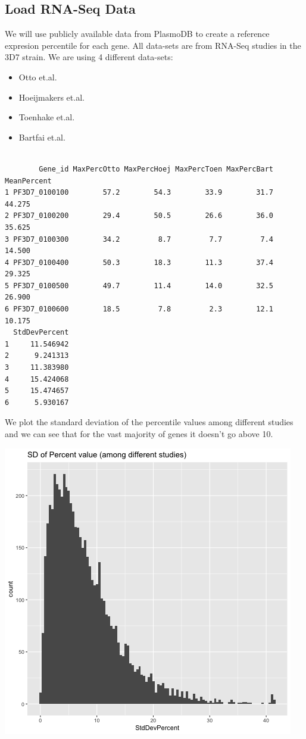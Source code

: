 \documentclass[11pt]{article}
\begin{document}
\subsection{Load RNA-Seq Data}
\label{sec:orga3ddbf5}
We will use publicly available data from PlasmoDB to create a reference expresion percentile for each gene.
All data-sets are from RNA-Seq studies in the 3D7 strain.
We are using 4 different data-sets:
\begin{itemize}
\item Otto et.al.
\item Hoeijmakers et.al.
\item Toenhake et.al.
\item Bartfai et.al.
\end{itemize}

\begin{verbatim}

        Gene_id MaxPercOtto MaxPercHoej MaxPercToen MaxPercBart MeanPercent
1 PF3D7_0100100        57.2        54.3        33.9        31.7      44.275
2 PF3D7_0100200        29.4        50.5        26.6        36.0      35.625
3 PF3D7_0100300        34.2         8.7         7.7         7.4      14.500
4 PF3D7_0100400        50.3        18.3        11.3        37.4      29.325
5 PF3D7_0100500        49.7        11.4        14.0        32.5      26.900
6 PF3D7_0100600        18.5         7.8         2.3        12.1      10.175
  StdDevPercent
1     11.546942
2      9.241313
3     11.383980
4     15.424068
5     15.474657
6      5.930167
\end{verbatim}

We plot the standard deviation of the percentile values among different studies and we can see that for the vast majority of genes it doesn't go above 10.
\begin{center}
\includegraphics[width=.9\linewidth]{./Plots/rnaseq_perc_sd.png}
\end{center}
\end{document}
